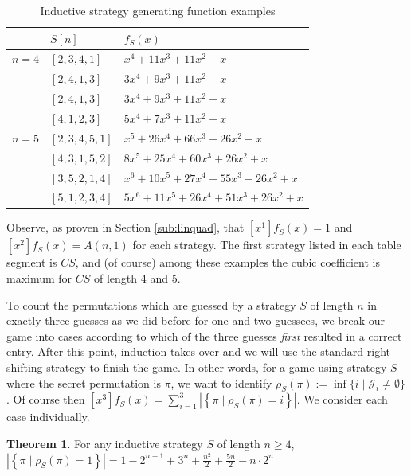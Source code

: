 \documentclass[article]{amsart}
\theoremstyle{definition}
\newtheorem{theorem}{Theorem}[section]
\theoremstyle{definition}
\theoremstyle{remark}
\begin{document}
\begin{table}[h!]
    \caption{Inductive strategy generating function examples}
    \centering
    \begin{tabular}{ll|l}
         & $S[n]$ & $f_S(x)$ \\
        \hline 
        \hline 
        $n=4$ & $[2,3,4,1]$ & $x^4 + 11x^3 + 11x^2 + x$ \\
        & $[2,4,1,3]$ & $3x^4 + 9x^3 + 11x^2 + x$ \\
        & $[2,4,1,3]$ & $3x^4 + 9x^3 + 11x^2 + x$ \\
        & $[4,1,2,3]$ & $5x^4 + 7x^3 + 11x^2 + x$ \\
        \hline 
        $n=5$ & $[2,3,4,5,1]$ & $x^5 + 26x^4 + 66x^3 + 26x^2 + x$  \\
        & $[4,3,1,5,2]$ & $8x^5 + 25x^4 + 60x^3 + 26x^2 + x$ \\
        & $[3,5,2,1,4]$ & $x^6 + 10x^5 + 27x^4 + 55x^3 + 26x^2 + x$ \\
        & $[5,1,2,3,4]$ & $5x^6 + 11x^5 + 26x^4 + 51x^3 + 26x^2 + x$  \\
    \end{tabular}
    \label{tab:gf_examples}
\end{table}

Observe, as proven in Section \ref{sub:linquad}, that $[x^1]f_S(x) = 1$ and $[x^2]f_S(x) = A(n,1)$ for each strategy. The first strategy listed in each table segment is $CS$, and (of course) among these examples the cubic coefficient is maximum for $CS$ of length 4 and 5.

To count the permutations which are guessed by a strategy $S$ of length $n$ in exactly three guesses as we did before for one and two guessees, we break our game into cases according to which of the three guesses \textit{first} resulted in a correct entry. After this point, induction takes over and we will use the standard right shifting strategy to finish the game. In other words, for a game using strategy $S$ where the secret permutation is $\pi$, we want to identify $\rho_S(\pi) := \inf \{ i \mid \mathcal{J}_i \neq \emptyset \}$. Of course then $[x^3]f_S(x) = \sum_{i=1}^3 \left| \left\{ \pi \mid \rho_S(\pi) = i \right\} \right|$. We consider each case individually.

\begin{theorem} \label{thm:rho1}
    For any inductive strategy $S$ of length $n \geq 4$, $\left| \left\{ \pi \mid \rho_S(\pi) = 1 \right\} \right| = 1 - 2^{n + 1} + 3^n + \frac{n^2}{2} + \frac{5n}{2} - n\cdot 2^n$
\end{theorem}
\end{document}
